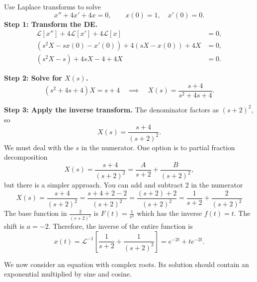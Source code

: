 \documentclass[10pt,letterpaper]{article}
\begin{document}
\begin{example}[5]{
Use Laplace transforms to solve
\[
x''+4x'+4x=0,\qquad x(0)=1,\quad x'(0)=0.
\]
}
\textbf{Step 1: Transform the DE.}
\begin{align*}
\mathcal{L}[x'']+4\mathcal{L}[x']+4\mathcal{L}[x]&=0,\\
(s^2X-sx(0)-x'(0))+4(sX-x(0))+4X&=0,\\
(s^2X-s)+4sX-4+4X&=0.
\end{align*}

\textbf{Step 2: Solve for $X(s)$.}
\[
(s^2+4s+4)X=s+4
\quad\implies\quad
X(s)=\frac{s+4}{s^2+4s+4}.
\]

\textbf{Step 3: Apply the inverse transform.}
The denominator factors as $(s+2)^2$, so
\[
X(s)=\frac{s+4}{(s+2)^2}.
\]
We must deal with the $s$ in the numerator. One option is to partial fraction decomposition
$$
X(s)=\frac{s+4}{(s+2)^2} = \frac{A}{s+2}+\frac{B}{(s+2)^2},
$$
but there is a simpler approach. You can add and subtract 2 in the numerator 
$$
X(s)=\frac{s+4}{(s+2)^2} = \frac{s+4+2-2}{(s+2)^2}=\frac{(s+2)+2}{(s+2)^2} = \frac{1}{s+2}+\frac{2}{(s+2)^2}
$$
The base function in $\frac{2}{(s+2)^2}$ is $F(t)=\frac{1}{s^2}$ which has the inverse $f(t)=t$. The shift is $a=-2$. Therefore, the inverse of the entire function is 
\[
x(t)=\mathcal{L}^{-1}\left[\frac{1}{s+2}+\frac{1}{(s+2)^2}\right]=
\boxed{
e^{-2t}+te^{-2t}.
}
\]
\end{example}


We now consider an equation with complex roots. Its solution should contain
an exponential multiplied by sine and cosine. 
\end{document}
